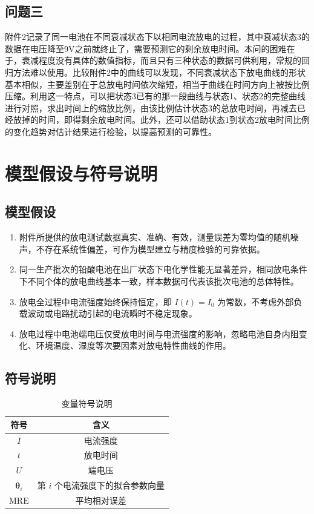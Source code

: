 \documentclass[withoutpreface,bwprint]{cumcmthesis} %
\begin{document}
\subsection{问题三}
附件2记录了同一电池在不同衰减状态下以相同电流放电的过程，其中衰减状态3的数据在电压降至9V之前就终止了，需要预测它的剩余放电时间。本问的困难在于，衰减程度没有具体的数值指标，而且只有三种状态的数据可供利用，常规的回归方法难以使用。比较附件2中的曲线可以发现，不同衰减状态下放电曲线的形状基本相似，主要差别在于总放电时间依次缩短，相当于曲线在时间方向上被按比例压缩。利用这一特点，可以把状态3已有的那一段曲线与状态1、状态2的完整曲线进行对照，求出时间上的缩放比例，由该比例估计状态3的总放电时间，再减去已经放掉的时间，即得剩余放电时间。此外，还可以借助状态1到状态2放电时间比例的变化趋势对估计结果进行检验，以提高预测的可靠性。
\section{模型假设与符号说明}
\subsection{模型假设}
\begin{enumerate}
    \item 附件所提供的放电测试数据真实、准确、有效，测量误差为零均值的随机噪声，不存在系统性偏差，可作为模型建立与精度检验的可靠依据。
    \item 同一生产批次的铅酸电池在出厂状态下电化学性能无显著差异，相同放电条件下不同个体的放电曲线基本一致，样本数据可代表该批次电池的总体特性。
    \item 放电全过程中电流强度始终保持恒定，即 $I\left(t\right)=I_{0}$ 为常数，不考虑外部负载波动或电路扰动引起的电流瞬时不稳定现象。
    \item 放电过程中电池端电压仅受放电时间与电流强度的影响，忽略电池自身内阻变化、环境温度、湿度等次要因素对放电特性曲线的作用。
\end{enumerate}
\subsection{符号说明}
\begin{table}[H]
\centering
\caption{变量符号说明}
\label{tab:symbol}
\begin{tabular}{cc}
\toprule
符号 & 含义 \\
\midrule
$I$ & 电流强度 \\
$t$ & 放电时间 \\
$U$ & 端电压 \\
$\boldsymbol{\theta }_{i}$ & 第 $i$ 个电流强度下的拟合参数向量 \\
$\mathrm{MRE}$ & 平均相对误差 \\
\bottomrule
\end{tabular}
\end{table}
\end{document}
